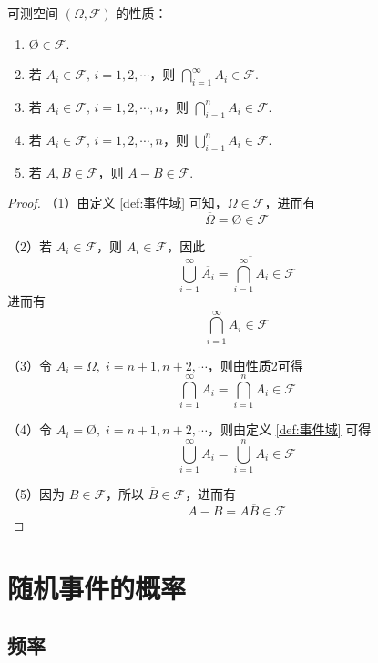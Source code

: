 \begin{property}
    \indent 可测空间 $(\varOmega, \mathcal{F})$ 的性质：
    \begin{enumerate}
        \item $\text{\O} \in \mathcal{F}$.
        \item 若 $A_i \in \mathcal{F}, \, i=1,2,\cdots$，则 $\displaystyle\bigcap_{i=1}^{\infty} A_i \in \mathcal{F}$.
        \item 若 $A_i \in \mathcal{F}, \, i=1,2,\cdots,n$，则 $\displaystyle\bigcap_{i=1}^n A_i \in \mathcal{F}$.
        \item 若 $A_i \in \mathcal{F}, \, i=1,2,\cdots,n$，则 $\displaystyle\bigcup_{i=1}^n A_i \in \mathcal{F}$.
        \item 若 $A,B \in \mathcal{F}$，则 $A-B \in \mathcal{F}$.
    \end{enumerate}
\end{property}

\begin{proof}
    （1）由定义 \ref{def:事件域} 可知，$\varOmega \in \mathcal{F}$，进而有
    $$
    \overline{\varOmega} = \text{\O} \in \mathcal{F}
    $$

    （2）若 $A_i \in \mathcal{F}$，则 $\overline{A_i} \in \mathcal{F}$，因此
    $$
    \bigcup_{i=1}^{\infty} \overline{A_i} = \overline{\bigcap_{i=1}^{\infty} A_i} \in \mathcal{F}
    $$
    进而有
    $$
    \bigcap_{i=1}^{\infty} A_i \in \mathcal{F}
    $$

    （3）令 $A_{i} = \varOmega,\; i = n+1, n+2, \cdots$，则由性质2可得
    $$
    \bigcap_{i=1}^{\infty} A_i = \bigcap_{i=1}^{n} A_i \in \mathcal{F}
    $$

    （4）令 $A_{i} = \text{\O},\; i = n+1, n+2, \cdots$，则由定义 \ref{def:事件域} 可得
    $$
    \bigcup_{i=1}^{\infty} A_i = \bigcup_{i=1}^{n} A_i \in \mathcal{F}
    $$

    （5）因为 $B \in \mathcal{F}$，所以 $\overline{B} \in \mathcal{F}$，进而有
    $$
    A-B = A \overline{B} \in \mathcal{F}
    $$

    \vspace{-2em}
\end{proof}

\section{随机事件的概率}

\subsection{频率}

